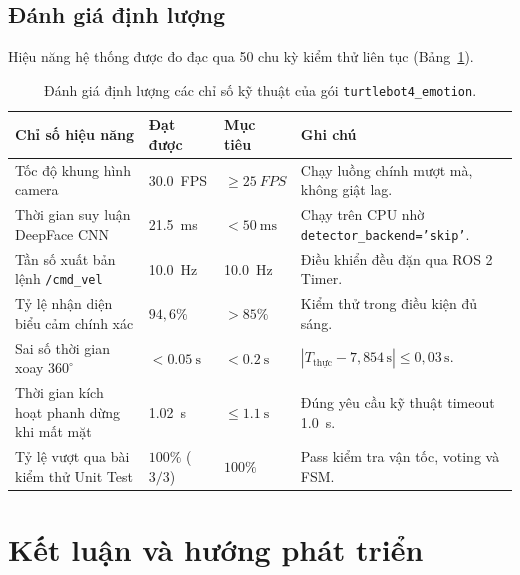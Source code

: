 \subsection{Đánh giá định lượng}
Hiệu năng hệ thống được đo đạc qua 50 chu kỳ kiểm thử liên tục (Bảng~\ref{tab:performance_metrics}).

\begin{table}[H]
\centering
\footnotesize
\renewcommand{\arraystretch}{1.25}
\setlength{\tabcolsep}{3pt}
\begin{tabularx}{\textwidth}{
    >{\raggedright\arraybackslash}p{4.6cm}
    >{\centering\arraybackslash}p{2.2cm}
    >{\centering\arraybackslash}p{2.2cm}
    >{\raggedright\arraybackslash}X}
\toprule
\textbf{Chỉ số hiệu năng} & \textbf{Đạt được} & \textbf{Mục tiêu} & \textbf{Ghi chú} \\
\midrule
Tốc độ khung hình camera & \SI{30.0}{FPS} & $\ge \SI{25}{FPS}$ & Chạy luồng chính mượt mà, không giật lag. \\
Thời gian suy luận DeepFace CNN & \SI{21.5}{\milli\second} & $< \SI{50}{\milli\second}$ & Chạy trên CPU nhờ \texttt{detector\_backend='skip'}. \\
Tần số xuất bản lệnh \texttt{/cmd\_vel} & \SI{10.0}{\hertz} & \SI{10.0}{\hertz} & Điều khiển đều đặn qua ROS 2 Timer. \\
Tỷ lệ nhận diện biểu cảm chính xác & $94{,}6\%$ & $> 85\%$ & Kiểm thử trong điều kiện đủ sáng. \\
Sai số thời gian xoay $360^\circ$ & $< \SI{0.05}{\second}$ & $< \SI{0.2}{\second}$ & $|T_{\text{thực}} - 7{,}854\,\text{s}| \le 0{,}03\,\text{s}$. \\
Thời gian kích hoạt phanh dừng khi mất mặt & \SI{1.02}{\second} & $\le \SI{1.1}{\second}$ & Đúng yêu cầu kỹ thuật timeout \SI{1.0}{\second}. \\
Tỷ lệ vượt qua bài kiểm thử Unit Test & $100\%$ ($3/3$) & $100\%$ & Pass kiểm tra vận tốc, voting và FSM. \\
\bottomrule
\end{tabularx}
\caption{Đánh giá định lượng các chỉ số kỹ thuật của gói \texttt{turtlebot4\_emotion}.}
\label{tab:performance_metrics}
\end{table}

\section{Kết luận và hướng phát triển}

